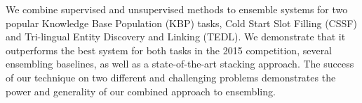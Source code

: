 We combine supervised and unsupervised methods to ensemble systems for two popular Knowledge Base Population (KBP) tasks, Cold Start Slot Filling (CSSF) and Tri-lingual Entity Discovery and Linking (TEDL). We demonstrate that it outperforms the best system for both tasks in the 2015 competition, several ensembling baselines, as well as a state-of-the-art stacking approach. The success of our technique on two different and challenging problems demonstrates the power and generality of our combined approach to ensembling.
